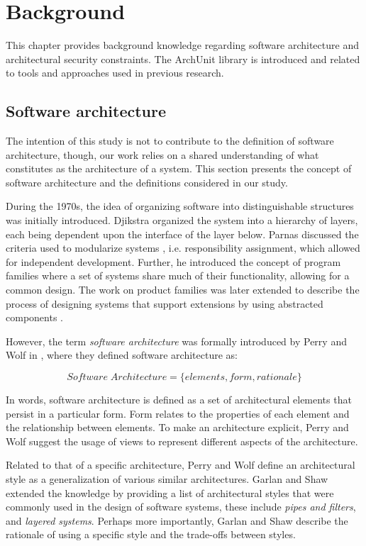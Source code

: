 \chapter{Background}

This chapter provides background knowledge regarding software architecture and architectural security constraints. The ArchUnit library is introduced and related to tools and approaches used in previous research.

\section{Software architecture}
The intention of this study is not to contribute to the definition of software architecture, though, our work relies on a shared understanding of what constitutes as the architecture of a system. This section presents the concept of software architecture and the definitions considered in our study.   

During the 1970s,  the idea of organizing software into distinguishable structures was initially introduced. Djikstra \cite{dijkstra_structure_1968} organized the system into a hierarchy of layers, each being dependent upon the interface of the layer below. Parnas discussed the criteria used to modularize systems \cite{broy_criteria_1972}, i.e. responsibility assignment, which allowed for independent development. Further, he introduced the concept of program families \cite{parnas_design_1976} where a set of systems share much of their functionality, allowing for a common design. The work on product families was later extended to describe the process of designing systems that support extensions by using abstracted components \cite{parnas_designing_1979}. 

However, the term \textit{software architecture} was formally introduced by Perry and Wolf in \cite{perry_foundations_1992}, where they defined software architecture as:

\[ Software \;  Architecture = \{elements,form,rationale\} \]

In words, software architecture is defined as a set of architectural elements that persist in a particular form. Form relates to the properties of each element and the relationship between elements. To make an architecture explicit, Perry and Wolf \cite{perry_foundations_1992} suggest the usage of views to represent different aspects of the architecture. 

Related to that of a specific architecture, Perry and Wolf \cite{perry_foundations_1992} define an architectural style as a generalization of various similar architectures. Garlan and Shaw \cite{ambriola_introduction_1993} extended the knowledge by providing a list of architectural styles that were commonly used in the design of software systems, these include \textit{pipes and filters}, and \textit{layered systems}. Perhaps more importantly, Garlan and Shaw \cite{ambriola_introduction_1993} describe the rationale of using a specific style and the trade-offs between styles.

